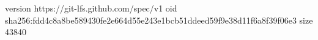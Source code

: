version https://git-lfs.github.com/spec/v1
oid sha256:fdd4c8a8be589430fe2e664d55e243e1bcb51ddeed59f9e38d11f6a8f39f06e3
size 43840
